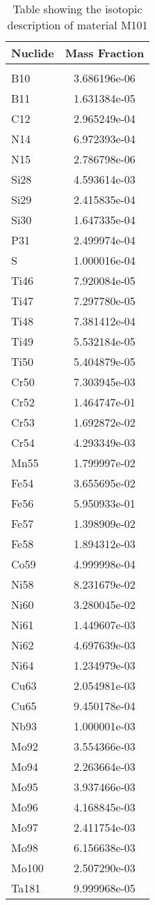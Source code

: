 \begin{centering}
\begin{table}[ht!]
\begin{tabular}{l | c}
\hline
Nuclide & Mass Fraction\\
\hline
\\
B10 & 3.686196e-06\\
B11 & 1.631384e-05\\
C12 & 2.965249e-04\\
N14 & 6.972393e-04\\
N15 & 2.786798e-06\\
Si28 & 4.593614e-03\\
Si29 & 2.415835e-04\\
Si30 & 1.647335e-04\\
P31 & 2.499974e-04\\
S & 1.000016e-04\\
Ti46 & 7.920084e-05\\
Ti47 & 7.297780e-05\\
Ti48 & 7.381412e-04\\
Ti49 & 5.532184e-05\\
Ti50 & 5.404879e-05\\
Cr50 & 7.303945e-03\\
Cr52 & 1.464747e-01\\
Cr53 & 1.692872e-02\\
Cr54 & 4.293349e-03\\
Mn55 & 1.799997e-02\\
Fe54 & 3.655695e-02\\
Fe56 & 5.950933e-01\\
Fe57 & 1.398909e-02\\
Fe58 & 1.894312e-03\\
Co59 & 4.999998e-04\\
Ni58 & 8.231679e-02\\
Ni60 & 3.280045e-02\\
Ni61 & 1.449607e-03\\
Ni62 & 4.697639e-03\\
Ni64 & 1.234979e-03\\
Cu63 & 2.054981e-03\\
Cu65 & 9.450178e-04\\
Nb93 & 1.000001e-03\\
Mo92 & 3.554366e-03\\
Mo94 & 2.263664e-03\\
Mo95 & 3.937466e-03\\
Mo96 & 4.168845e-03\\
Mo97 & 2.411754e-03\\
Mo98 & 6.156638e-03\\
Mo100 & 2.507290e-03\\
Ta181 & 9.999968e-05
\end{tabular}
\caption{Table showing the isotopic description of material M101}
\label{table:material_M101}
\end{table}\clearpage


\end{centering}
